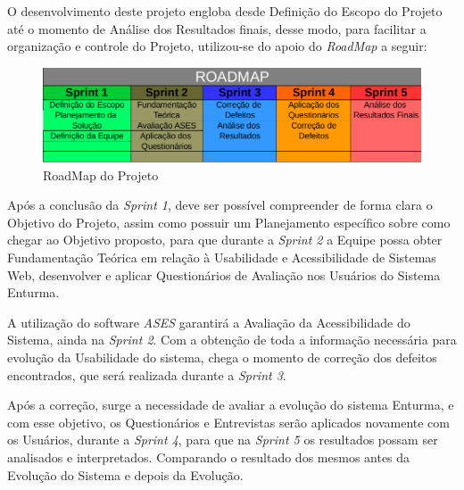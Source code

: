 	
	O desenvolvimento deste projeto engloba desde Definição do Escopo do Projeto até o momento de Análise dos Resultados finais, desse modo, para facilitar a organização e controle do Projeto, utilizou-se do apoio do \textit{RoadMap} a seguir:
	
	\begin{figure}[H]
		\centering
		\includegraphics[width=1\textwidth]{imagens/roadmap}
		\caption{RoadMap do Projeto}
		\label{img:roadmap}
	\end{figure}

	Após a conclusão da \textit{Sprint 1}, deve ser possível compreender de forma clara o Objetivo do Projeto, assim como possuir um Planejamento específico sobre como chegar ao Objetivo proposto, para que durante a \textit{Sprint 2} a Equipe possa obter Fundamentação Teórica em relação à Usabilidade e Acessibilidade de Sistemas Web, desenvolver e aplicar Questionários de Avaliação nos Usuários do Sistema Enturma.

	A utilização do software \textit{ASES} garantirá a Avaliação da Acessibilidade do Sistema, ainda na \textit{Sprint 2}. Com a obtenção de toda a informação necessária para evolução da Usabilidade do sistema, chega o momento de correção dos defeitos encontrados, que será realizada durante a \textit{Sprint 3}.

	Após a correção, surge a necessidade de avaliar a evolução do sistema Enturma, e com esse objetivo, os Questionários e Entrevistas serão aplicados novamente com os Usuários, durante a \textit{Sprint 4}, para que na \textit{Sprint 5} os resultados possam ser analisados e interpretados. Comparando o resultado dos mesmos antes da Evolução do Sistema e depois da Evolução.